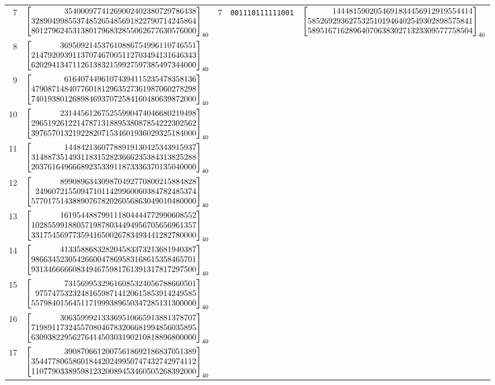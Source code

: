 \documentclass[11pt]{article}
\theoremstyle{remark}
\numberwithin{equation}{section}
\begin{document}
\begin{longtable}{rcrlc}
7&$\srgBigInt{35400097741269002402380729786438}{3289049985537485265485691822790714245864}{8012796245313801796832855062677630576000}$&7&\texttt{001110111111001}&$\srgBigInt{1444815902054691834456912919554414}{5852692936275325101946402549302898575841}{5895167162896407063830271323309577758504}$\\[1pt]

8&$\srgBigInt{369509214537610886754996110746551}{2147920939113707467005112703494131646343}{6202941347112613832159927597385497344000}$&&&\\[1pt]

9&$\srgBigInt{61640744961074394115235478358136}{4790871484077601812963527361987060278298}{7401938012689846937072584160480639872000}$&&&\\[1pt]

10&$\srgBigInt{231445612675255990474046680219498}{2965192612214787131889538087854222302562}{3976570132192282071534601936029325184000}$&&&\\[1pt]

11&$\srgBigInt{14484213607788919130425343915937}{3148873514931183152823666235384313825288}{2037616496668923533911873336370135040000}$&&&\\[1pt]

12&$\srgBigInt{899089634309870492770800215884828}{249607215509471011429960060384782485374}{5770175143889076782026056863049010480000}$&&&\\[1pt]

13&$\srgBigInt{161954488799111804444772990608552}{1028559918805719878034494956705656961357}{3317545697735941650026783493441282780000}$&&&\\[1pt]

14&$\srgBigInt{413358868328204583373213681940387}{9866345230542660047869583168615358465701}{9313466666083494675981761391317817297500}$&&&\\[1pt]

15&$\srgBigInt{73156995329616085324056788660501}{975747532324816598714120615853914249585}{5579840156451171999389650347285131300000}$&&&\\[1pt]

16&$\srgBigInt{306359992133369510665913881378707}{7198911732455708046783206681994856035895}{6309382295627641450303190210818896800000}$&&&\\[1pt]

17&$\srgBigInt{39087066120075618692186837051389}{3544778065860184420249950747432742974112}{1107790338959812320089453460505268392000}$&&&\\[1pt]

\end{longtable}\endgroup
\end{document}
